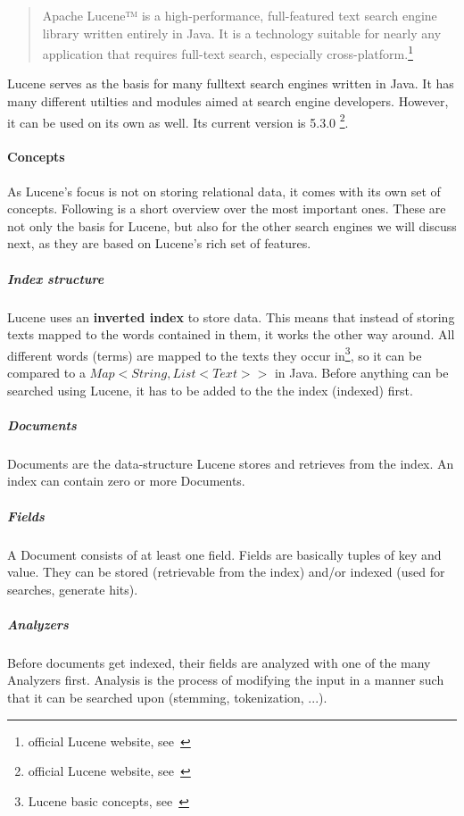 \begin{quote}
	Apache Lucene™ is a high-performance, full-featured text search engine library written entirely in Java. It is a technology suitable for nearly any application that requires full-text search, especially cross-platform.\footnote{official Lucene website, see~\cite{lucene_apache_org}}
\end{quote}
Lucene serves as the basis for many fulltext search engines written in Java. It has many different utilties and modules aimed at search engine developers. However, it can be used on its own as well. Its current version is 5.3.0 \footnote{official Lucene website, see~\cite{lucene_apache_org}}.

\paragraph{Concepts}

As Lucene's focus is not on storing relational data, it comes with its own set of concepts. Following is a short overview over the most important ones. These are not only the basis for Lucene, but also for the other search engines we will discuss next, as they are based on Lucene's rich set of features.

\subparagraph{Index structure}
Lucene uses an \textbf{inverted index} to store data. This means that instead of storing texts mapped to the words contained in them, it works the other way around. All different words (terms) are mapped to the texts they occur in\footnote{Lucene basic concepts, see~\cite{lucene_basic_concepts}}, so it can be compared to a \(Map<String, List<Text>>\) in Java. Before anything can be searched using Lucene, it has to be added to the the index (indexed) first.

\subparagraph{Documents}
Documents are the data-structure Lucene stores and retrieves from the index. An index can contain zero or more Documents.

\subparagraph{Fields}
A Document consists of at least one field. Fields are basically tuples of key and value. They can be stored (retrievable from the index) and/or indexed (used for searches, generate hits).

\subparagraph{Analyzers}
Before documents get indexed, their fields are analyzed with one of the many Analyzers first. Analysis is the process of modifying the input in a manner such that it can be searched upon (stemming, tokenization, ...).

\pagebreak

